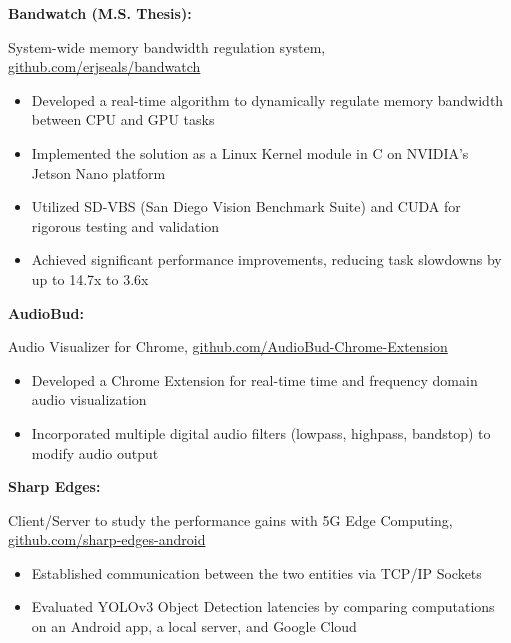 \documentclass[letterpaper,10pt]{article}
\newcommand{\resumeItem}[2]{
  \item\normalsize{
    {#1}{#2 \vspace{-2pt}}
  }
}
\newcommand{\resumeSubItem}[2]{\resumeItem{#1}{#2}\vspace{-4pt}}
\begin{document}
{      \resumeSubItem{\textbf{Bandwatch (M.S. Thesis): }}
      {System-wide memory bandwidth regulation system, \href{https://github.com/erjseals/bandwatch}{github.com/erjseals/bandwatch}
         \vspace{-4pt}
         \begin{itemize}
          \item Developed a real-time algorithm to dynamically regulate memory bandwidth between CPU and GPU tasks
          \vspace{-1pt}
          \item Implemented the solution as a Linux Kernel module in C on NVIDIA's Jetson Nano platform
          \vspace{-1pt}
          \item Utilized SD-VBS (San Diego Vision Benchmark Suite) and CUDA for rigorous testing and validation
          \vspace{-1pt}
          \item Achieved significant performance improvements, reducing task slowdowns by up to 14.7x to 3.6x
         \end{itemize}
      }

     \vspace{4pt}

      \resumeSubItem{\textbf{AudioBud: }}
      {Audio Visualizer for Chrome, \href{https://github.com/eric-delacruz-prod/AudioBud-Chrome-Extension}{github.com/AudioBud-Chrome-Extension}
         \vspace{-4pt}
         \begin{itemize}
            \item Developed a Chrome Extension for real-time time and frequency domain audio visualization
            \vspace{-1pt}
            \item Incorporated multiple digital audio filters (lowpass, highpass, bandstop) to modify audio output
         \end{itemize}
      }

      \vspace{4pt}

      \resumeSubItem{\textbf{Sharp Edges: }}
      {Client/Server to study the performance gains with 5G Edge Computing, \href{https://github.com/erjseals/sharp-edges-android}{github.com/sharp-edges-android}
         \vspace{-4pt}
         \begin{itemize}
          \item Established communication between the two entities via TCP/IP Sockets 
          \vspace{-1pt}
          \item Evaluated YOLOv3 Object Detection latencies by comparing computations on an Android app, a local server, and Google Cloud
         \end{itemize}
      }

}
\end{document}
